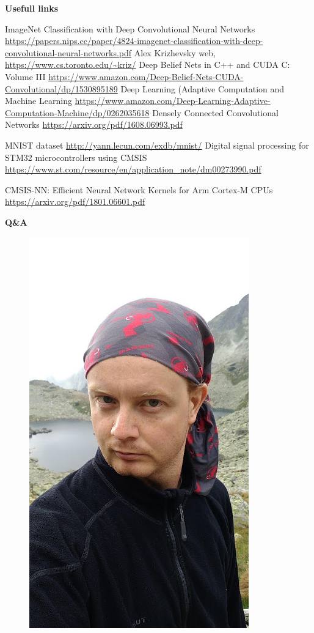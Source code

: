 \documentclass[xcolor=dvipsnames]{beamer}
\begin{document}
\begin{frame}{\bf Usefull links}

{\tiny
  \begin{thebibliography}{9}
    \bibitem {}ImageNet Classification with Deep Convolutional Neural Networks \url{https://papers.nips.cc/paper/4824-imagenet-classification-with-deep-convolutional-neural-networks.pdf}
    \bibitem {}Alex Krizhevsky web, \url{https://www.cs.toronto.edu/~kriz/}
    \bibitem {}Deep Belief Nets in C++ and CUDA C: Volume III \url{https://www.amazon.com/Deep-Belief-Nets-CUDA-Convolutional/dp/1530895189}
    \bibitem {}Deep Learning (Adaptive Computation and Machine Learning \url{https://www.amazon.com/Deep-Learning-Adaptive-Computation-Machine/dp/0262035618}
    \bibitem {}Densely Connected Convolutional Networks \url{https://arxiv.org/pdf/1608.06993.pdf}

    \bibitem {}MNIST dataset \url{http://yann.lecun.com/exdb/mnist/}
    \bibitem {}Digital signal processing for STM32 microcontrollers using CMSIS \url{https://www.st.com/resource/en/application_note/dm00273990.pdf}

    \bibitem {}CMSIS-NN: Efficient Neural Network Kernels for Arm Cortex-M CPUs \url{https://arxiv.org/pdf/1801.06601.pdf}

  \end{thebibliography}
}

\end{frame}


\begin{frame}{\bf Q\&A}

\begin{figure}
  \includegraphics[scale=0.25]{../../pictures/me.jpg}
\end{figure}



\end{frame}
\end{document}
